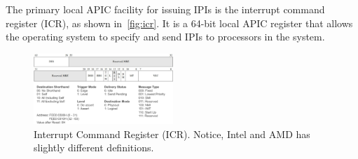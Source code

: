The primary local APIC facility for issuing IPIs is the interrupt command register (ICR), as shown in~\autoref{fig:icr}. It is a 64-bit local APIC register that allows the operating system to specify and send IPIs to processors in the system.


\begin{figure}[th]
  \includegraphics[width=0.47\textwidth]{figures/icr2}
  \centering
  \caption{Interrupt Command Register (ICR). Notice, Intel and AMD has slightly different definitions.~\cite{intelapic}~\cite{amdapic}}
  \label{fig:icr}
\end{figure}

